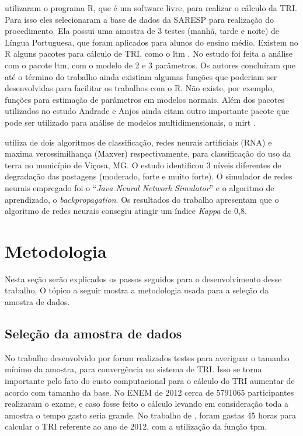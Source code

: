 \documentclass[article,	12pt,	oneside, a4paper,	english, brazil, sumario=tradicional, section=TITLE]{abntex2}
\begin{document}
 utilizaram o programa R, que é um software livre, para realizar o cálculo da TRI. Para isso eles selecionaram a base de dados da SARESP para realização do procedimento. Ela possui uma amostra de 3 testes (manhã, tarde e noite) de Língua Portuguesa, que foram aplicados para alunos do ensino médio. Existem no R alguns pacotes para cálculo de TRI, como o ltm \cite{ltm}. No estudo foi feita a análise com o pacote ltm, com o modelo de 2 e 3 parâmetros. Os autores concluíram que até o término do trabalho ainda existiam algumas funções que poderiam ser desenvolvidas para facilitar os trabalhos com o R. Não existe, por exemplo, funções para estimação de parâmetros em modelos normais. Além dos pacotes utilizados no estudo Andrade e Anjos ainda citam outro importante pacote que pode ser utilizado para análise de modelos multidimensionais, o mirt \cite{mirt}.

 utiliza de dois algoritmos de classificação, redes neurais artificiais (RNA) e maxima verossimilhança (Maxver) respectivamente, para classificação do uso da terra no município de Viçosa, MG. O estudo identificou 3 níveis diferentes de degradação das pastagens (moderado, forte e muito forte). O simulador de redes neurais empregado foi o “\textit{Java Neural Network Simulator}” e o algoritmo de aprendizado, o \textit{backpropagation}. Os resultados do trabalho apresentam que o algoritmo de redes neurais consegiu atingir um índice \textit{Kappa} de 0,8.

\section{Metodologia}
Nesta seção serão explicados os passos seguidos para o desenvolvimento desse trabalho. O tópico a seguir mostra a metodologia usada para a seleção da amostra de dados.

 \subsection{Seleção da amostra de dados}
 
	No trabalho desenvolvido por \cite{sancineto2005impacto} foram realizados testes para averiguar o tamanho mínimo da amostra, para convergência no sistema de TRI. Isso se torna importante pelo fato do custo computacional para o cálculo do TRI aumentar de acordo com tamanho da base. No ENEM de 2012 cerca de 5791065 participantes realizaram o exame, e caso fosse feito o cálculo levando em consideração toda a amostra o tempo gasto seria grande. No trabalho de \cite{castro}, foram gastas 45 horas para calcular o TRI referente ao ano de 2012, com a utilização da função tpm.
\end{document}

